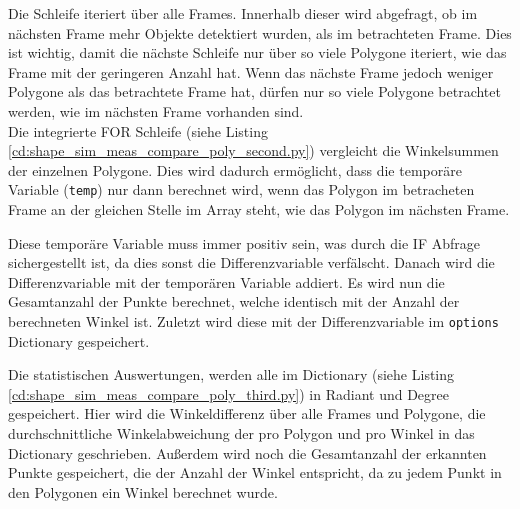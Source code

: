 {	Die Schleife iteriert über alle Frames. Innerhalb dieser wird abgefragt, ob im nächsten Frame mehr Objekte detektiert wurden, als im betrachteten Frame. Dies ist wichtig, damit die nächste Schleife nur über so viele Polygone iteriert, wie das Frame mit der geringeren Anzahl hat. Wenn das nächste Frame jedoch weniger Polygone als das betrachtete Frame hat, dürfen nur so viele Polygone betrachtet werden, wie im nächsten Frame vorhanden sind. \\
	
	Die integrierte FOR Schleife (siehe Listing \ref{cd:shape_sim_meas_compare_poly_second.py}) vergleicht die Winkelsummen der einzelnen Polygone. Dies wird dadurch ermöglicht, dass die temporäre Variable (\lstinline|temp|) nur dann berechnet wird, wenn das Polygon im betracheten Frame an der gleichen Stelle im Array steht, wie das Polygon im nächsten Frame. 
	
	Diese temporäre Variable muss immer positiv sein, was durch die IF Abfrage sichergestellt ist, da dies sonst die Differenzvariable verfälscht. Danach wird die Differenzvariable mit der temporären Variable addiert. Es wird nun die Gesamtanzahl der Punkte berechnet, welche identisch mit der Anzahl der berechneten Winkel ist. Zuletzt wird diese mit der Differenzvariable im \lstinline|options| Dictionary gespeichert. 
	 
	Die statistischen Auswertungen, werden alle im Dictionary (siehe Listing \ref{cd:shape_sim_meas_compare_poly_third.py}) in Radiant und Degree gespeichert. Hier wird  die Winkeldifferenz über alle Frames und Polygone, die durchschnittliche Winkelabweichung der pro Polygon und pro Winkel in das Dictionary geschrieben. Außerdem wird noch die Gesamtanzahl der erkannten Punkte gespeichert, die der Anzahl der Winkel entspricht, da zu jedem Punkt in den Polygonen ein Winkel berechnet wurde. \\
	
}

